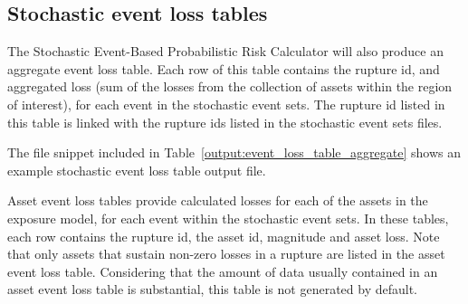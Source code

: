 \subsection{Stochastic event loss tables}

The Stochastic Event-Based Probabilistic Risk Calculator will also produce an
aggregate event loss table. Each row of this table contains the rupture id,
and aggregated loss (sum of the losses from the collection of assets within
the region of interest), for each event in the stochastic event sets. The
rupture id listed in this table is linked with the rupture ids listed in the
stochastic event sets files.

The file snippet included in Table~\ref{output:event_loss_table_aggregate}
shows an example stochastic event loss table output file.




Asset event loss tables provide calculated losses for each of the assets in
the exposure model, for each event within the stochastic event sets. In these
tables, each row contains the rupture id, the asset id, magnitude and asset
loss. Note that only assets that sustain non-zero losses in a rupture are
listed in the asset event loss table. Considering that the amount of data
usually contained in an asset event loss table is substantial, this table is
not generated by default. 

